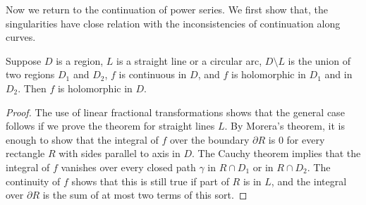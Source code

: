 Now we return to the continuation of power series. We first show that, the singularities have close relation with the inconsistencies of continuation along curves.
\begin{theorem}
Suppose $D$ is a region, $L$ is a straight line or a circular arc, $D\setminus L$ is the union of two regions $D_1$ and $D_2$, $f$ is continuous in $D$, and $f$ is holomorphic in $D_1$ and in $D_2$. Then $f$ is holomorphic in $D$.
\end{theorem}
\begin{proof}
The use of linear fractional transformations shows that the general case follows if we prove the theorem for straight lines $L$. By Morera's theorem, it is enough to show that the integral of $f$ over the boundary $\partial R$ is $0$ for every rectangle $R$ with sides parallel to axis in $D$. The Cauchy theorem implies that the integral of $f$ vanishes over every closed path $\gamma$ in $R\cap D_1$ or in $R\cap D_2$. The continuity of $f$ shows that this is still true if part of $R$ is in $L$, and the integral over $\partial R$ is the sum of at most two terms of this sort.
\end{proof}
